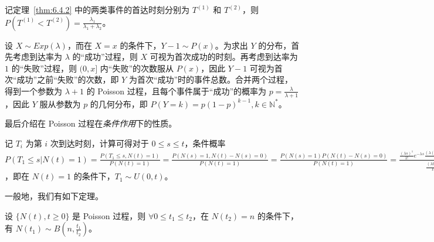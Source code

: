 \documentclass[../main.tex]{subfiles}
\begin{document}
\begin{theorem}\label{thm:6.4.3}
    记定理~\ref{thm:6.4.2} 中的两类事件的首达时刻分别为 $T^{(1)}$ 和 $T^{(2)}$，则 $P(T^{(1)}<T^{(2)})=\frac{\lambda_1}{\lambda_1+\lambda_2}$。
\end{theorem}

\begin{example}
    设 $X\sim Exp(\lambda)$，而在 $X=x$ 的条件下，$Y-1\sim P(x)$。为求出 $Y$ 的分布，首先考虑到达率为 $\lambda$ 的“成功”过程，则 $X$ 可视为首次成功的时刻。再考虑到达率为 $1$ 的“失败”过程，则 $(0,x]$ 内“失败”的次数服从 $P(x)$，因此 $Y-1$ 可视为首次“成功”之前“失败”的次数，即 $Y$ 为首次“成功”时的事件总数。合并两个过程，得到一个参数为 $\lambda+1$ 的 Poisson 过程，且每个事件属于“成功”的概率为 $p=\frac{\lambda}{\lambda+1}$，因此 $Y$ 服从参数为 $p$ 的几何分布，即 $P(Y=k)=p(1-p)^{k-1},k\in\mathbb N^*$。
\end{example}

最后介绍在 Poisson 过程在\emph{条件作用}下的性质。

记 $T_i$ 为第 $i$ 次到达时刻，计算可得对于 $0\leq s\leq t$，条件概率 $P(T_1\leq s|N(t)=1)=\frac{P(T_1\leq s,N(t)=1)}{P(N(t)=1)}=\frac{P(N(s)=1,N(t)-N(s)=0)}{P(N(t)=1)}=\frac{P(N(s)=1)P(N(t)-N(s)=0)}{P(N(t)=1)}=\frac{\frac{(\lambda s)^1}{1!}e^{-\lambda s}\frac{(\lambda(t-s))^0}{0!}e^{-\lambda(t-s)}}{\frac{(\lambda t)^1}{1!}e^{-\lambda t}}=\frac st$，即在 $N(t)=1$ 的条件下，$T_1\sim U(0,t)$。

一般地，我们有如下定理。

\begin{theorem}\label{thm:6.4.4}
    设 $\{N(t),t\geq0\}$ 是 Poisson 过程，则 $\forall 0\leq t_1\leq t_2$，在 $N(t_2)=n$ 的条件下，有 $N(t_1)\sim B(n,\frac{t_1}{t_2})$。
\end{theorem}
\end{document}
